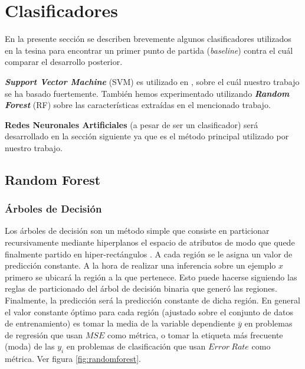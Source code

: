 \section{Clasificadores}

En la presente sección se describen brevemente algunos clasificadores utilizados en la tesina para encontrar un primer punto de partida (\textit{baseline}) contra el cuál comparar el desarrollo posterior.

\textit{\textbf{Support Vector Machine}} (SVM) es utilizado en \cite{tesis-parodi}, sobre el cuál nuestro trabajo se ha basado fuertemente. También hemos experimentado utilizando \textit{\textbf{Random Forest}} (RF) sobre las características extraídas en el mencionado trabajo.

\textbf{Redes Neuronales Artificiales} (a pesar de ser un clasificador) será desarrollado en la sección siguiente ya que es el método principal utilizado por nuestro trabajo.

\subsection{Random Forest}

\subsubsection{Árboles de Decisión}

Los árboles de decisión son un método simple que consiste en particionar recursivamente mediante hiperplanos el espacio de atributos de modo que quede finalmente partido en hiper-rectángulos \cite{Hastie}. A cada región se le asigna un valor de predicción constante. A la hora de realizar una inferencia sobre un ejemplo $x$ primero se ubicará la región a la que pertenece. Esto puede hacerse siguiendo las reglas de particionado del árbol de decisión binaria que generó las regiones. Finalmente, la predicción será la predicción constante de dicha región. En general el valor constante óptimo para cada región (ajustado sobre el conjunto de datos de entrenamiento) es tomar la media de la variable dependiente $\bar{y}$ en problemas de regresión que usan $MSE$ como métrica, o tomar la etiqueta más frecuente (moda) de las $y_i$ en problemas de clasificación que usan $Error~Rate$ como métrica. Ver figura \ref{fig:randomforest}.

